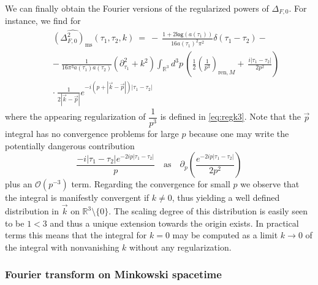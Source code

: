 \documentclass[11pt]{book}
\renewcommand{\log}{\mathsf{log}}
\newcommand{\bigint}{\displaystyle\int}
\newcommand{\Ocal}{\mathcal{O}}
\theoremstyle{break}
\begin{document}
We can finally obtain the Fourier versions of the regularized powers of $\Delta_{F,0}$. For instance, we find for 
%
\begin{eqnarray}
&& \widehat{\left(\Delta^2_{F,0}\right)_\text{ms}}(\tau_1,\tau_2,k) \ = \ - \ \frac{1+2\log (a(\tau_1))}{16a(\tau_1)^2\pi^2}\delta(\tau_1-\tau_2)- \nonumber \\
&& - \ \frac{1}{16\pi^3 a(\tau_1)a(\tau_2)}(\partial^2_{\tau_1}+k^2)\bigint_{\mathbb{R}^3}d^3p\,\left(\frac12\left(\frac{1}{p^3}\right)_{\text{ren},M}  + \ \frac{i|\tau_1-\tau_2|}{2p^2}\right) \nonumber \\
&& \cdot \ \frac{1}{2|\vec{k}-\vec{p}|}e^{-i(p+|\vec{k}-\vec{p}|)|\tau_1-\tau_2|}
\label{eq:fourier_square}
\end{eqnarray}
%
where the appearing regularization of $\dfrac{1}{p^3}$ is defined in \eqref{eq:regk3}. Note that the $\vec{p}$ integral has no convergence problems for large $p$ because one may write the potentially dangerous contribution 
%
\begin{equation*}
\frac{-i|\tau_1-\tau_2|e^{-2ip|\tau_1-\tau_2|}}{p}
\quad
\mbox{as}
\quad
\partial_p\left( \dfrac{e^{-2ip|\tau_1-\tau_2|}}{2p^2}\right) 
\end{equation*}
%
plus an $\Ocal(p^{-3})$ term. Regarding the convergence for small $p$ we observe that the integral is manifestly convergent if $k\neq0$, thus yielding a well defined distribution in $\vec{k}$ on $\mathbb{R}^3\setminus\{0\}$. The scaling degree of this distribution is easily seen to be $1<3$ and thus a unique extension towards the origin exists. In practical terms this means that the integral for $k=0$ may be computed as a limit $k\to0$ of the integral with nonvanishing $k$ without any regularization. 


\subsubsection{Fourier transform on Minkowski spacetime}
\end{document}
